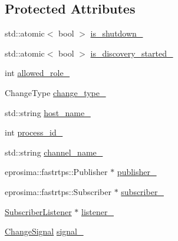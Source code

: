 \subsection*{Protected Attributes}
\begin{DoxyCompactItemize}
\item 
std\-::atomic$<$ bool $>$ \hyperlink{classapollo_1_1cyber_1_1service__discovery_1_1Manager_a260bde7ce1d7749c3cb35e98b820d278}{is\-\_\-shutdown\-\_\-}
\item 
std\-::atomic$<$ bool $>$ \hyperlink{classapollo_1_1cyber_1_1service__discovery_1_1Manager_a8a8bd0560f76ccb0be2a37fd62fbb2d8}{is\-\_\-discovery\-\_\-started\-\_\-}
\item 
int \hyperlink{classapollo_1_1cyber_1_1service__discovery_1_1Manager_a901cf709cf2707faf0ced991bc2da591}{allowed\-\_\-role\-\_\-}
\item 
Change\-Type \hyperlink{classapollo_1_1cyber_1_1service__discovery_1_1Manager_a26dbcd395983f96ff00060648e16ff93}{change\-\_\-type\-\_\-}
\item 
std\-::string \hyperlink{classapollo_1_1cyber_1_1service__discovery_1_1Manager_a6e221053092ac40fd6810510a3eb10cc}{host\-\_\-name\-\_\-}
\item 
int \hyperlink{classapollo_1_1cyber_1_1service__discovery_1_1Manager_ac251ffb4700b4b901451ad9f103ccdd8}{process\-\_\-id\-\_\-}
\item 
std\-::string \hyperlink{classapollo_1_1cyber_1_1service__discovery_1_1Manager_a2ff877c30b287c1a5c7efeedfde0afe0}{channel\-\_\-name\-\_\-}
\item 
eprosima\-::fastrtps\-::\-Publisher $\ast$ \hyperlink{classapollo_1_1cyber_1_1service__discovery_1_1Manager_ab5caa9d2feb69e9746f6371a908d2661}{publisher\-\_\-}
\item 
eprosima\-::fastrtps\-::\-Subscriber $\ast$ \hyperlink{classapollo_1_1cyber_1_1service__discovery_1_1Manager_a4324a7de5c025ab948d210916bbadcb2}{subscriber\-\_\-}
\item 
\hyperlink{classapollo_1_1cyber_1_1service__discovery_1_1SubscriberListener}{Subscriber\-Listener} $\ast$ \hyperlink{classapollo_1_1cyber_1_1service__discovery_1_1Manager_a8dd4cf136c87d16027530af545cb0842}{listener\-\_\-}
\item 
\hyperlink{classapollo_1_1cyber_1_1service__discovery_1_1Manager_a9730b844d88e23f65d5dcbcfca1a7d59}{Change\-Signal} \hyperlink{classapollo_1_1cyber_1_1service__discovery_1_1Manager_af92680680a5e900f48f8a39d9a0524f9}{signal\-\_\-}
\end{DoxyCompactItemize}


